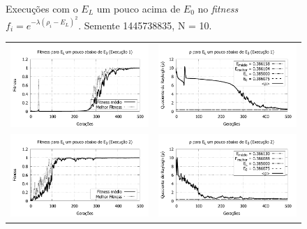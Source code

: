 \begin{figure}[htbp]
\begin{tabular}{@{}cc@{}}
		
  \end{tabular}
  \caption{Execuções com o $E_L$ um pouco acima de $E_0$ no \textit{fitness} $f_i = e^{-\lambda(\rho_i - E_L)^2}$. Semente 1445738835, N = 10.}
	\label{fig:variando_EL_pouco_acima}
	\end{figure}
	

	\begin{figure}[htbp]
	\centering
  \begin{tabular}{@{}cc@{}}
    
			
		\includegraphics[width=.49\textwidth]{figs/resultados/variandoEL/T2E1_fitness.pdf} &
    \includegraphics[width=.49\textwidth]{figs/resultados/variandoEL/T2E1_rho.pdf}   \\

		\includegraphics[width=.49\textwidth]{figs/resultados/variandoEL/T2E2_fitness.pdf} &
    \includegraphics[width=.49\textwidth]{figs/resultados/variandoEL/T2E2_rho.pdf}   \\
		

\end{tabular}
\end{figure}
